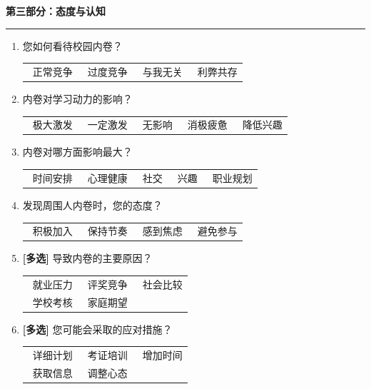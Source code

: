 \documentclass[win,thesis]{hustreport} %
\begin{document}
\begin{appendixblock}
		\vspace{1.5em}
		
		\noindent\textbf{\large 第三部分：态度与认知}
		\hrule \vspace{0.5em}
		
		\begin{enumerate}[label=\textbf{Q\arabic*.}, start=15, leftmargin=3em, itemsep=1em]
			\item 您如何看待校园内卷？\\
			\begin{tabularx}{\linewidth}{XXXX}
				\radio\ 正常竞争 & \radio\ 过度竞争 & \radio\ 与我无关 & \radio\ 利弊共存
			\end{tabularx}
			
			\item 内卷对学习动力的影响？\\
			\begin{tabularx}{\linewidth}{XXXXX}
				\radio\ 极大激发 & \radio\ 一定激发 & \radio\ 无影响 & \radio\ 消极疲惫 & \radio\ 降低兴趣
			\end{tabularx}
			
			\item 内卷对哪方面影响最大？\\
			\begin{tabularx}{\linewidth}{XXXXX}
				\radio\ 时间安排 & \radio\ 心理健康 & \radio\ 社交 & \radio\ 兴趣 & \radio\ 职业规划
			\end{tabularx}
			
			\item 发现周围人内卷时，您的态度？\\
			\begin{tabularx}{\linewidth}{XXXX}
				\radio\ 积极加入 & \radio\ 保持节奏 & \radio\ 感到焦虑 & \radio\ 避免参与
			\end{tabularx}
			
			\item \textbf{[多选]} 导致内卷的主要原因？\\
			\begin{tabularx}{\linewidth}{XXX}
				\checkb\ 就业压力 & \checkb\ 评奖竞争 & \checkb\ 社会比较 \\
				\checkb\ 学校考核 & \checkb\ 家庭期望 & 
			\end{tabularx}
			
			\item \textbf{[多选]} 您可能会采取的应对措施？\\
			\begin{tabularx}{\linewidth}{XXX}
				\checkb\ 详细计划 & \checkb\ 考证培训 & \checkb\ 增加时间 \\
				\checkb\ 获取信息 & \checkb\ 调整心态 & 
			\end{tabularx}
		\end{enumerate}
\newpage

\end{appendixblock}
\end{document}
